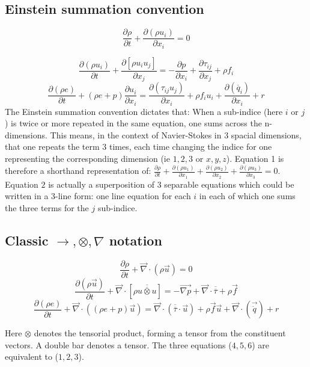 \subsection{Einstein summation convention}

\begin{equation}
\frac{\partial \rho}{\partial t} + \frac{\partial(\rho u_{i})}{\partial x_{i}} = 0
\end{equation}

\begin{equation}
\frac{\partial (\rho u_{i})}{\partial t} + \frac{\partial[\rho u_{i}u_{j}]}{\partial x_{j}} = -\frac{\partial p}{\partial x_{i}} + \frac{\partial \tau_{ij}}{\partial x_{j}} + \rho f_{i} \end{equation}
\begin{equation}
\frac{\partial (\rho e)}{\partial t} + (\rho e+p)\frac{\partial u_{i}}{\partial x_{i}} = \frac{\partial(\tau_{ij}u_{j})}{\partial x_{i}} + \rho f_{i}u_{i} + \frac{\partial(\dot{ q_{i}})}{\partial x_{i}} + r \end{equation}
The Einstein summation convention dictates that: When a sub-indice (here $i$ or $j$) is twice or more repeated in the same equation, one sums across the n-dimensions. 
This means, in the context of Navier-Stokes in 3 spacial dimensions, that one repeats the term 3 times, each time changing the indice for one representing the corresponding dimension (ie $1,2,3$ or $x,y,z$). Equation 1 is therefore a shorthand representation of: $\frac{\partial \rho}{\partial t}+\frac{\partial(\rho u_{1})}{\partial x_{1}}+\frac{\partial(\rho u_{2})}{\partial x_{2}}+ \frac{\partial(\rho u_{3})}{\partial x_{3}}=0$.
Equation $2$ is actually a superposition of 3 separable equations which could be written in a 3-line form: one line equation for each $i$ in each of which one sums the three terms for the $j$ sub-indice.
\subsection{Classic $\longrightarrow , \otimes , \nabla$ notation}
\begin{equation}
\frac{\partial \rho}{\partial t} + \overrightarrow{\nabla}\cdot(\rho\overrightarrow{u})=0 \end{equation}
\begin{equation}
\frac{\partial(\rho \overrightarrow{u})}{\partial t} + \overrightarrow{\nabla}\cdot[\rho\overline{\overline{u\otimes u}}] = -\overrightarrow{\nabla p} + \overrightarrow{\nabla}\cdot\overline{\overline{\tau}} + \rho\overrightarrow{f} \end{equation}
\begin{equation}
\frac{\partial(\rho e)}{\partial t} + \overrightarrow{\nabla}\cdot((\rho e + p)\overrightarrow{u}) = \overrightarrow{\nabla}\cdot(\overline{\overline{\tau}}\cdot\overrightarrow{u}) + \rho\overrightarrow{f}\overrightarrow{u} + \overrightarrow{\nabla}\cdot(\overrightarrow{\dot{q}})+r \end{equation}

Here $\otimes$ denotes the tensorial product, forming a tensor from the constituent vectors. A double bar denotes a tensor. The three equations ($4,5,6$) are equivalent to ($1,2,3$).
    
